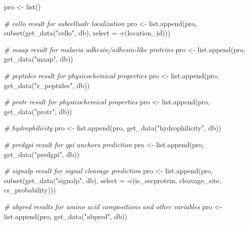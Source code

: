 \documentclass[
  11pt,
  oneside]{book}
\newenvironment{Shaded}{\begin{snugshade}}{\end{snugshade}}
\newcommand{\AttributeTok}[1]{\textcolor[rgb]{0.77,0.63,0.00}{#1}}
\newcommand{\CommentTok}[1]{\textcolor[rgb]{0.56,0.35,0.01}{\textit{#1}}}
\newcommand{\FunctionTok}[1]{\textcolor[rgb]{0.00,0.00,0.00}{#1}}
\newcommand{\NormalTok}[1]{#1}
\newcommand{\OtherTok}[1]{\textcolor[rgb]{0.56,0.35,0.01}{#1}}
\newcommand{\SpecialCharTok}[1]{\textcolor[rgb]{0.00,0.00,0.00}{#1}}
\newcommand{\StringTok}[1]{\textcolor[rgb]{0.31,0.60,0.02}{#1}}
\begin{document}
\begin{Shaded}
\begin{Highlighting}[]
\NormalTok{pro }\OtherTok{\textless{}{-}} \FunctionTok{list}\NormalTok{()}

\CommentTok{\# cello result for subcellualr localization}
\NormalTok{pro }\OtherTok{\textless{}{-}} \FunctionTok{list.append}\NormalTok{(pro, }\FunctionTok{subset}\NormalTok{(}\FunctionTok{get\_data}\NormalTok{(}\StringTok{"cello"}\NormalTok{, db), }\AttributeTok{select =} \SpecialCharTok{{-}}\FunctionTok{c}\NormalTok{(location\_id)))}

\CommentTok{\# maap result for malaria adhesin/adhesin{-}like proteins}
\NormalTok{pro }\OtherTok{\textless{}{-}} \FunctionTok{list.append}\NormalTok{(pro, }\FunctionTok{get\_data}\NormalTok{(}\StringTok{"maap"}\NormalTok{, db))}

\CommentTok{\# peptides result for physicochemical properties}
\NormalTok{pro }\OtherTok{\textless{}{-}} \FunctionTok{list.append}\NormalTok{(pro, }\FunctionTok{get\_data}\NormalTok{(}\StringTok{"r\_peptides"}\NormalTok{, db))}

\CommentTok{\# protr result for physicochemical properties}
\NormalTok{pro }\OtherTok{\textless{}{-}} \FunctionTok{list.append}\NormalTok{(pro, }\FunctionTok{get\_data}\NormalTok{(}\StringTok{"protr"}\NormalTok{, db))}

\CommentTok{\# hydrophilicity}
\NormalTok{pro }\OtherTok{\textless{}{-}} \FunctionTok{list.append}\NormalTok{(pro, }\FunctionTok{get\_data}\NormalTok{(}\StringTok{"hydrophilicity"}\NormalTok{, db))}

\CommentTok{\# predgpi result for gpi anchors prediction}
\NormalTok{pro }\OtherTok{\textless{}{-}} \FunctionTok{list.append}\NormalTok{(pro, }\FunctionTok{get\_data}\NormalTok{(}\StringTok{"predgpi"}\NormalTok{, db))}

\CommentTok{\# signalp result for signal cleavage prediction}
\NormalTok{pro }\OtherTok{\textless{}{-}} \FunctionTok{list.append}\NormalTok{(pro, }\FunctionTok{subset}\NormalTok{(}\FunctionTok{get\_data}\NormalTok{(}\StringTok{"signalp"}\NormalTok{, db), }\AttributeTok{select =} \SpecialCharTok{{-}}\FunctionTok{c}\NormalTok{(is\_secprotein, cleavage\_site, cs\_probability)))}

\CommentTok{\# abpred results for amino acid compositions and other variables}
\NormalTok{pro }\OtherTok{\textless{}{-}} \FunctionTok{list.append}\NormalTok{(pro, }\FunctionTok{get\_data}\NormalTok{(}\StringTok{"abpred"}\NormalTok{, db))}


\end{Highlighting}
\end{Shaded}
\end{document}

